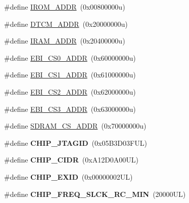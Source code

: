 \begin{DoxyCompactItemize}
\item 
\#define \mbox{\hyperlink{group__SAMV71Q19__definitions_ga694212ffb8c2786bacee3d0ad6020bda}{I\+R\+O\+M\+\_\+\+A\+D\+DR}}~(0x00800000u)
\item 
\#define \mbox{\hyperlink{group__SAMV71Q19__definitions_ga26626a425f7ebb3a0c2dbc276f0d9f78}{D\+T\+C\+M\+\_\+\+A\+D\+DR}}~(0x20000000u)
\item 
\#define \mbox{\hyperlink{group__SAMV71Q19__definitions_gaae45ac2ef16942159481c767ac4805cf}{I\+R\+A\+M\+\_\+\+A\+D\+DR}}~(0x20400000u)
\item 
\#define \mbox{\hyperlink{group__SAMV71Q19__definitions_ga9bcbb97ddae3b2cc5e2c9613d33f66b4}{E\+B\+I\+\_\+\+C\+S0\+\_\+\+A\+D\+DR}}~(0x60000000u)
\item 
\#define \mbox{\hyperlink{group__SAMV71Q19__definitions_gaaddd9fdbbc77c9aced5308819f502a26}{E\+B\+I\+\_\+\+C\+S1\+\_\+\+A\+D\+DR}}~(0x61000000u)
\item 
\#define \mbox{\hyperlink{group__SAMV71Q19__definitions_ga058a35f9991487dc2dd12ada792d0730}{E\+B\+I\+\_\+\+C\+S2\+\_\+\+A\+D\+DR}}~(0x62000000u)
\item 
\#define \mbox{\hyperlink{group__SAMV71Q19__definitions_gad66ebdd0fc33ec3cf85dbaa14bbf05d9}{E\+B\+I\+\_\+\+C\+S3\+\_\+\+A\+D\+DR}}~(0x63000000u)
\item 
\#define \mbox{\hyperlink{group__SAMV71Q19__definitions_ga61b7db25daf759c2a2beb6e5a0b57a84}{S\+D\+R\+A\+M\+\_\+\+C\+S\+\_\+\+A\+D\+DR}}~(0x70000000u)
\item 
\mbox{\label{group__SAMV71Q19__definitions_gaa614519778eec0df55d3eeab3223e3f6}} 
\#define {\bfseries C\+H\+I\+P\+\_\+\+J\+T\+A\+G\+ID}~(0x05\+B3\+D03\+F\+U\+L)
\item 
\mbox{\label{group__SAMV71Q19__definitions_ga1e1ae44dd9269a8a98c1d7e7a60e9fbd}} 
\#define {\bfseries C\+H\+I\+P\+\_\+\+C\+I\+DR}~(0x\+A12\+D0\+A00\+U\+L)
\item 
\mbox{\label{group__SAMV71Q19__definitions_ga35123717aa86b76bb6b73cf3adc4c2e6}} 
\#define {\bfseries C\+H\+I\+P\+\_\+\+E\+X\+ID}~(0x00000002\+U\+L)
\item 
\mbox{\label{group__SAMV71Q19__definitions_ga0e868bf27426399dfdcb3a9dfc3733c4}} 
\#define {\bfseries C\+H\+I\+P\+\_\+\+F\+R\+E\+Q\+\_\+\+S\+L\+C\+K\+\_\+\+R\+C\+\_\+\+M\+IN}~(20000\+U\+L)

\end{DoxyCompactItemize}
